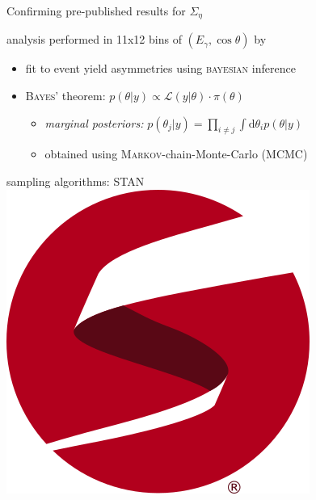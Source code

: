 \documentclass[11pt,aspectratio=169,dvipsnames]{beamer}
\newcommand{\thecolor}{black!70!blue}
\begin{document}
	\begin{frame}[noframenumbering]{Confirming pre-published results for $\Sigma_\eta$}
		\begin{minipage}{\linewidth}
			\begin{tcolorbox}[colback=blue!5,colframe=\thecolor,title={Event selection ($\eta$)}]
				analysis performed in 11x12 bins of $(E_\gamma,\cos\theta)$ by \cites{eta}
			\end{tcolorbox}
		\end{minipage}
		\begin{minipage}{\linewidth}
			\begin{tcolorbox}[colback=blue!5,colframe=\thecolor,title={Method}]
				\begin{itemize}
					\item fit to event yield asymmetries using \textsc{bayesian} inference
					\item \textsc{Bayes'} theorem: $p(\theta|y)\propto\mathcal{L}(y|\theta)\cdot\pi(\theta)$
					\begin{itemize}
						\item \emph{marginal posteriors:} $p(\theta_j|y)=\prod_{i\neq j}\int\text{d}\theta_i p(\theta|y)$
						\item obtained using \textsc{Markov}-chain-Monte-Carlo (MCMC)
						
					\end{itemize} 
				\end{itemize}
				\begin{flushright}
					sampling algorithms: STAN \includegraphics[width=.1\linewidth]{figs/logo-tm.png}\\
					\cites{stan}
				\end{flushright}
			\end{tcolorbox}
		\end{minipage}
		
	\end{frame}
	
\end{document}
